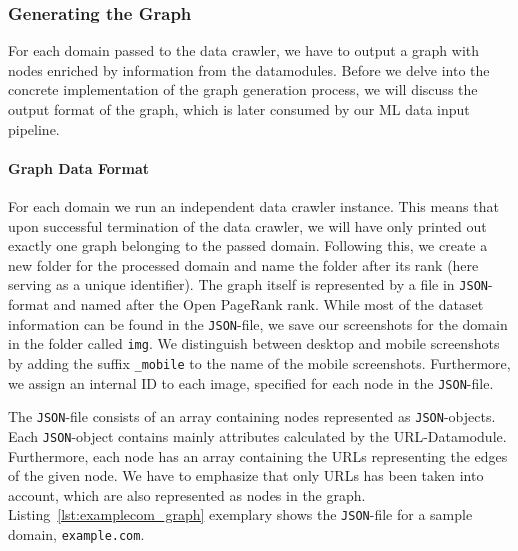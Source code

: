 \subsubsection{Generating the Graph}
\label{datacrawler_graph}

For each domain passed to the data crawler, we have to output a graph with nodes enriched by information from the datamodules. Before we delve into the concrete implementation of the graph generation process, we will discuss the output format of the graph, which is later consumed by our ML data input pipeline.

\paragraph*{Graph Data Format}

For each domain we run an independent data crawler instance. This means that upon successful termination of the data crawler, we will have only printed out exactly one graph belonging to the passed domain. Following this, we create a new folder for the processed domain and name the folder after its rank (here serving as a unique identifier). The graph itself is represented by a file in \texttt{JSON}-format and named after the Open PageRank rank. While most of the dataset information can be found in the \texttt{JSON}-file, we save our screenshots for the domain in the folder called \texttt{img}. We distinguish between desktop and mobile screenshots by adding the suffix \texttt{\_mobile} to the name of the mobile screenshots. Furthermore, we assign an internal ID to each image, specified for each node in the \texttt{JSON}-file.

The \texttt{JSON}-file consists of an array containing nodes represented as \texttt{JSON}-objects. Each \texttt{JSON}-object contains mainly attributes calculated by the URL-Datamodule. Furthermore, each node has an array containing the URLs representing the edges of the given node. We have to emphasize that only URLs has been taken into account, which are also represented as nodes in the graph. Listing~\ref{lst:examplecom_graph} exemplary shows the \texttt{JSON}-file for a sample domain, \texttt{example.com}.

